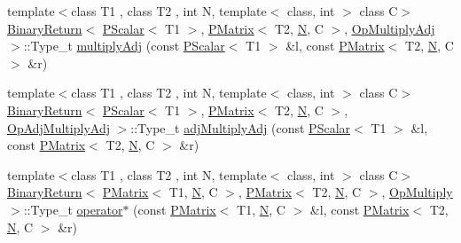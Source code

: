 \begin{DoxyCompactItemize}
{\footnotesize template$<$class T1 , class T2 , int N, template$<$ class, int $>$ class C$>$ }\\\mbox{\hyperlink{structENSEM_1_1BinaryReturn}{Binary\+Return}}$<$ \mbox{\hyperlink{classENSEM_1_1PScalar}{P\+Scalar}}$<$ T1 $>$, \mbox{\hyperlink{classENSEM_1_1PMatrix}{P\+Matrix}}$<$ T2, \mbox{\hyperlink{operator__name__util_8cc_a7722c8ecbb62d99aee7ce68b1752f337}{N}}, C $>$, \mbox{\hyperlink{structENSEM_1_1OpMultiplyAdj}{Op\+Multiply\+Adj}} $>$\+::Type\+\_\+t \mbox{\hyperlink{group__primmatrix_ga500e40c33d8e7e4a2a95970fb8a56326}{multiply\+Adj}} (const \mbox{\hyperlink{classENSEM_1_1PScalar}{P\+Scalar}}$<$ T1 $>$ \&l, const \mbox{\hyperlink{classENSEM_1_1PMatrix}{P\+Matrix}}$<$ T2, \mbox{\hyperlink{operator__name__util_8cc_a7722c8ecbb62d99aee7ce68b1752f337}{N}}, C $>$ \&r)
\item 
{\footnotesize template$<$class T1 , class T2 , int N, template$<$ class, int $>$ class C$>$ }\\\mbox{\hyperlink{structENSEM_1_1BinaryReturn}{Binary\+Return}}$<$ \mbox{\hyperlink{classENSEM_1_1PScalar}{P\+Scalar}}$<$ T1 $>$, \mbox{\hyperlink{classENSEM_1_1PMatrix}{P\+Matrix}}$<$ T2, \mbox{\hyperlink{operator__name__util_8cc_a7722c8ecbb62d99aee7ce68b1752f337}{N}}, C $>$, \mbox{\hyperlink{structENSEM_1_1OpAdjMultiplyAdj}{Op\+Adj\+Multiply\+Adj}} $>$\+::Type\+\_\+t \mbox{\hyperlink{group__primmatrix_ga5b52c2e633a016e706b74e388b8af102}{adj\+Multiply\+Adj}} (const \mbox{\hyperlink{classENSEM_1_1PScalar}{P\+Scalar}}$<$ T1 $>$ \&l, const \mbox{\hyperlink{classENSEM_1_1PMatrix}{P\+Matrix}}$<$ T2, \mbox{\hyperlink{operator__name__util_8cc_a7722c8ecbb62d99aee7ce68b1752f337}{N}}, C $>$ \&r)
\item 
{\footnotesize template$<$class T1 , class T2 , int N, template$<$ class, int $>$ class C$>$ }\\\mbox{\hyperlink{structENSEM_1_1BinaryReturn}{Binary\+Return}}$<$ \mbox{\hyperlink{classENSEM_1_1PMatrix}{P\+Matrix}}$<$ T1, \mbox{\hyperlink{operator__name__util_8cc_a7722c8ecbb62d99aee7ce68b1752f337}{N}}, C $>$, \mbox{\hyperlink{classENSEM_1_1PMatrix}{P\+Matrix}}$<$ T2, \mbox{\hyperlink{operator__name__util_8cc_a7722c8ecbb62d99aee7ce68b1752f337}{N}}, C $>$, \mbox{\hyperlink{structENSEM_1_1OpMultiply}{Op\+Multiply}} $>$\+::Type\+\_\+t \mbox{\hyperlink{group__primmatrix_ga8f46104c9d9d10301141fdd1c0546a36}{operator$\ast$}} (const \mbox{\hyperlink{classENSEM_1_1PMatrix}{P\+Matrix}}$<$ T1, \mbox{\hyperlink{operator__name__util_8cc_a7722c8ecbb62d99aee7ce68b1752f337}{N}}, C $>$ \&l, const \mbox{\hyperlink{classENSEM_1_1PMatrix}{P\+Matrix}}$<$ T2, \mbox{\hyperlink{operator__name__util_8cc_a7722c8ecbb62d99aee7ce68b1752f337}{N}}, C $>$ \&r)

\end{DoxyCompactItemize}
